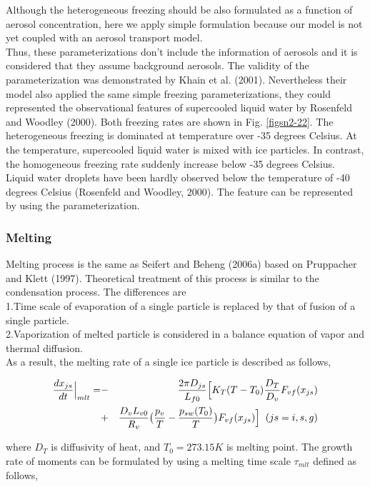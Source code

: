 Although the heterogeneous freezing should be also formulated as a function of aerosol concentration, here we apply simple formulation because our model is not yet coupled with an aerosol transport model.\\
Thus, these parameterizations don’t include the information of aerosols and it is considered that they assume background aerosols. The validity of the parameterization was demonstrated by Khain et al. (2001). Nevertheless their model also applied the same simple freezing parameterizations, they could represented the observational features of supercooled liquid water by Rosenfeld and Woodley (2000). Both freezing rates are shown in Fig. \ref{figsn2-22}. The heterogeneous freezing is dominated at temperature over -35 degrees Celsius. At the temperature, supercooled liquid water is mixed with ice particles. In contrast, the homogeneous freezing rate suddenly increase below -35 degrees Celsius. Liquid water droplets have been hardly observed below the temperature of -40 degrees Celsius (Rosenfeld and Woodley, 2000). The feature can be represented by using the parameterization.

\subsubsection{Melting}
Melting process is the same as Seifert and Beheng (2006a) based on Pruppacher and Klett (1997). Theoretical treatment of this process is similar to the condensation process. The differences are\\
1.Time scale of evaporation of a single particle is replaced by that of fusion of a single particle.\\
2.Vaporization of melted particle is considered in a balance equation of vapor and thermal diffusion.\\
As a result, the melting rate of a single ice particle is described as follows,

\begin{eqnarray}
\frac{dx_{js}}{dt}\Bigr|_{mlt}=&-&\frac{2\pi D_{js}}{L_{f0}}\Bigl[K_{T}(T-T_{0})\frac{D_{T}}{D_{v}}F_{vf}(x_{js})\nonumber\\
&+&\frac{D_{v}L_{v0}}{R_{v}}\bigr(\frac{p_{v}}{T}-\frac{p_{sw}(T_{0})}{T}\bigr)F_{vf}(x_{js})\Bigr]\;\;(js=i,s,g)\label{sn128}
\end{eqnarray}

where $D_{T}$ is diffusivity of heat, and $T_{0} = 273.15 K$ is melting point. The growth rate of moments can be formulated by using a melting time scale $\tau_{mlt}$ defined as follows, 

